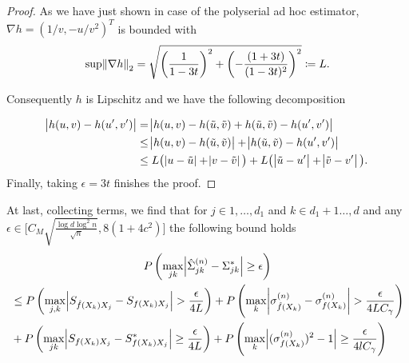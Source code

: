 \begin{proof}
    As we have just shown in case of the polyserial ad hoc estimator, $\nabla h = (1/v, -u/v^2)^T$ is bounded with 
    \begin{equation*}
       \sup \norm{\nabla h}_2 = \sqrt{\left(\frac{1}{1- 3t}\right)^2 + \left(-\frac{(1 + 3t)}{(1 - 3t)^2}\right)^2} \coloneqq L.
    \end{equation*}
    
    Consequently $h$ is Lipschitz and we have the following decomposition
    
    \begin{align*}
        \abs{h(u,v) - h(u',v')} &= \abs{h(u,v) - h(\tilde{u},\tilde{v}) + h(\tilde{u},\tilde{v}) - h(u',v')} \\
        &\leq \abs{h(u,v) - h(\tilde{u},\tilde{v})} + \abs{h(\tilde{u},\tilde{v}) - h(u',v')} \\
        &\leq L \big(\abs{u-\tilde{u}} + \abs{v-\tilde{v}}\big) + L \big(\abs{\tilde{u} - u'} + \abs{\tilde{v}-v'}\big).
    \end{align*}
    Finally, taking $\epsilon = 3t$ finishes the proof.
\end{proof}

At last, collecting terms, we find that for $j \in 1, \dots, d_1$ and $k \in d_1+1 \dots, d$ and any $\epsilon \in \Big[C_M\sqrt{\frac{\log d \log^2 n}{\sqrt{n}}},8(1+4c^2)\Big]$ the following bound holds
\begin{multline*}
    P\left(\max_{jk}\abs{\hat{\Sigma}_{jk}^{(n)} -  \Sigma_{jk}^{*}} \geq \epsilon \right) \\
    \begin{aligned}
    &\leq P\left(\max_{j,k} \abs{S_{\hat{f}(X_k)X_j} - S_{f(X_k)X_j}} > \frac{\epsilon}{4L} \right) + P\left(\max_k \abs{\sigma^{(n)}_{\hat{f}(X_k)} - \sigma^{(n)}_{f(X_k)}} > \frac{\epsilon}{4LC_\gamma} \right) \\
    &+ P\left(\max_{jk}\abs{S_{{f}(X_k)X_j} - S^*_{{f}(X_k)X_j}} \geq \frac{\epsilon}{4L} \right) +  P\left(\max_k \abs{(\sigma^{(n)}_{{f}(X_k)})^2 - 1} \geq \frac{\epsilon}{4lC_\gamma} \right)
    \end{aligned}
\end{multline*}

